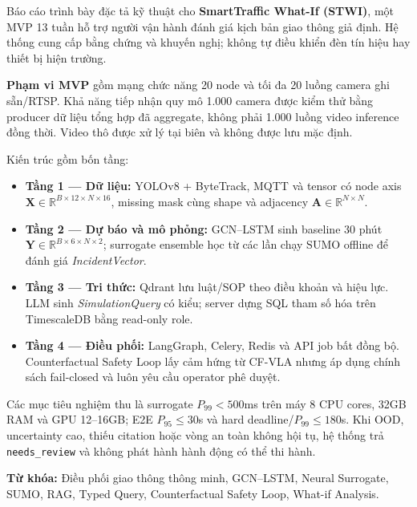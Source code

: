 Báo cáo trình bày đặc tả kỹ thuật cho \textbf{SmartTraffic What-If (STWI)}, một MVP 13 tuần hỗ trợ người vận hành đánh giá kịch bản giao thông giả định. Hệ thống cung cấp bằng chứng và khuyến nghị; không tự điều khiển đèn tín hiệu hay thiết bị hiện trường.

\bigskip
\textbf{Phạm vi MVP} gồm mạng chức năng 20 node và tối đa 20 luồng camera ghi sẵn/RTSP. Khả năng tiếp nhận quy mô 1.000 camera được kiểm thử bằng producer dữ liệu tổng hợp đã aggregate, không phải 1.000 luồng video inference đồng thời. Video thô được xử lý tại biên và không được lưu mặc định.

\bigskip
Kiến trúc gồm bốn tầng:
\begin{itemize}[leftmargin=1.5cm, itemsep=4pt]
  \item \textbf{Tầng 1 --- Dữ liệu:} YOLOv8 + ByteTrack, MQTT và tensor có node axis $\mathbf{X}\in\mathbb{R}^{B\times12\times N\times16}$, missing mask cùng shape và adjacency $\mathbf{A}\in\mathbb{R}^{N\times N}$.
  \item \textbf{Tầng 2 --- Dự báo và mô phỏng:} GCN--LSTM sinh baseline 30 phút $\mathbf{Y}\in\mathbb{R}^{B\times6\times N\times2}$; surrogate ensemble học từ các lần chạy SUMO offline để đánh giá \textit{IncidentVector}.
  \item \textbf{Tầng 3 --- Tri thức:} Qdrant lưu luật/SOP theo điều khoản và hiệu lực. LLM sinh \textit{SimulationQuery} có kiểu; server dựng SQL tham số hóa trên TimescaleDB bằng read-only role.
  \item \textbf{Tầng 4 --- Điều phối:} LangGraph, Celery, Redis và API job bất đồng bộ. Counterfactual Safety Loop lấy cảm hứng từ CF-VLA nhưng áp dụng chính sách fail-closed và luôn yêu cầu operator phê duyệt.
\end{itemize}

\bigskip
Các mục tiêu nghiệm thu là surrogate $P_{99}<500$ms trên máy 8 CPU cores, 32GB RAM và GPU 12--16GB; E2E $P_{95}\leq30$s và hard deadline/$P_{99}\leq180$s. Khi OOD, uncertainty cao, thiếu citation hoặc vòng an toàn không hội tụ, hệ thống trả \texttt{needs\_review} và không phát hành hành động có thể thi hành.

\bigskip
\noindent\textbf{Từ khóa:} Điều phối giao thông thông minh, GCN--LSTM, Neural Surrogate, SUMO, RAG, Typed Query, Counterfactual Safety Loop, What-if Analysis.
